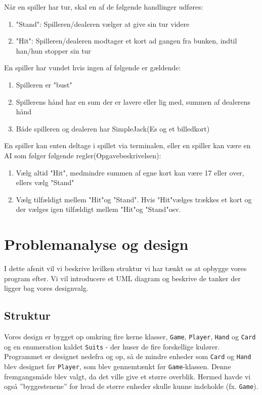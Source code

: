\documentclass[a4paper]{article}
\begin{document}
    Når en spiller har tur, skal en af de følgende handlinger udføres:
    \begin{enumerate}
      \item "Stand": Spilleren/dealeren vælger at give sin tur videre
      \item "Hit": Spilleren/dealeren modtager et kort ad gangen fra bunken,
      indtil han/hun stopper sin tur
    \end{enumerate}

    En spiller har vundet hvis ingen af følgende er gældende:
    \begin{enumerate}
      \item Spilleren er "bust"
      \item Spillerens hånd har en sum der er lavere eller lig med,
      summen af dealerens hånd
      \item Både spilleren og dealeren har SimpleJack(Es og et billedkort)
    \end{enumerate}

    En spiller kan enten deltage i spillet via terminalen,
    eller en spiller kan være en AI som følger følgende regler(Opgavebeskrivelsen):
    \begin{enumerate}
      \item Vælg altid "Hit", medmindre summen af egne kort kan være 17 eller over, ellers vælg "Stand"
      \item Vælg tilfældigt mellem "Hit"og "Stand". Hvis "Hit"vælges trækkes et kort og der vælges igen tilfældigt mellem "Hit"og "Stand"osv.
    \end{enumerate}

  \section{Problemanalyse og design} \label{sec:design}
    I dette afsnit vil vi beskrive hvilken struktur vi har tænkt os at opbygge vores program efter.
    Vi vil introducere et UML diagram og beskrive de tanker der ligger bag vores designvalg.

    \subsection*{Struktur}
      Vores design er bygget op omkring fire kerne klasser,
      \texttt{Game}, \texttt{\texttt{Player}}, \texttt{\texttt{Hand}} og \texttt{\texttt{Card}} og en enumeration kaldet \texttt{\texttt{Suits}} - der huser de fire forskellige kulører.
      Programmet er designet nedefra og op, så de mindre enheder som \texttt{\texttt{Card}} og \texttt{\texttt{Hand}} blev designet før \texttt{\texttt{Player}}, som blev gennemtænkt før \texttt{Game}-klassen. 
      Denne fremgangsmåde blev valgt, da det ville give et større overblik. Hermed havde vi også ”byggestenene” for hvad de større enheder skulle kunne indeholde (fx. \texttt{Game}).
\end{document}
